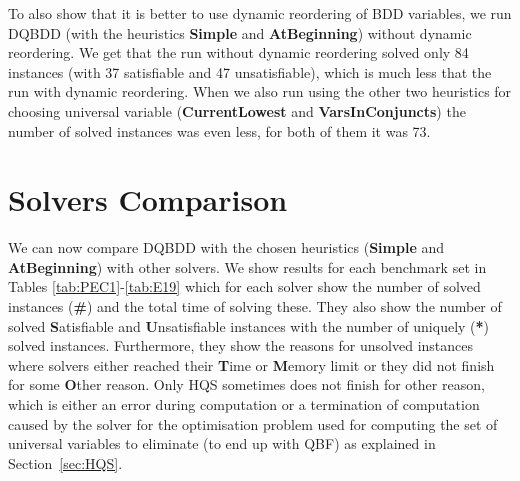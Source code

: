\documentclass[
  digital, %
  color,
  twoside, %
  table,   %
  nolof,     %
  nolot,     %
]{fithesis3}
\theoremstyle{definition}
\theoremstyle{remark}
\newcommand{\QEsimple}{\textbf{Simple}}
\newcommand{\QUatbeginning}{\textbf{At\-Be\-gin\-ning}}
\newcommand{\QUcurrentlowest}{\textbf{CurrentLowest}}
\newcommand{\QUvarsinconjuncts}{\textbf{VarsInConjuncts}}
\begin{document}
To also show that it is better to use dynamic reordering of BDD variables, we run DQBDD (with the heuristics \QEsimple{} and \QUatbeginning{}) without dynamic reordering. We get that the run without dynamic reordering solved only 84 instances (with 37 satisfiable and 47 unsatisfiable), which is much less that the run with dynamic reordering. When we also run using the other two heuristics for choosing universal variable (\QUcurrentlowest{} and \QUvarsinconjuncts{}) the number of solved instances was even less, for both of them it was 73.

\section{Solvers Comparison}
We can now compare DQBDD with the chosen heuristics (\QEsimple{} and \QUatbeginning{}) with other solvers. We show results for each benchmark set in Tables \ref{tab:PEC1}-\ref{tab:E19} which for each solver show the number of solved instances (\textbf{\#}) and the total time of solving these. They also show the number of solved \textbf{S}atisfiable and \textbf{U}n\-sa\-ti\-sfi\-able instances with the number of uniquely (\textbf{*}) solved instances. Furthermore, they show the reasons for unsolved instances where solvers either reached their \textbf{T}ime or \textbf{M}emory limit or they did not finish for some \textbf{O}ther reason. Only HQS sometimes does not finish for other reason, which is either an error during computation or a termination of computation caused by the solver for the optimisation problem used for computing the set of universal variables to eliminate (to end up with QBF) as explained in Section~\ref{sec:HQS}.
\end{document}
